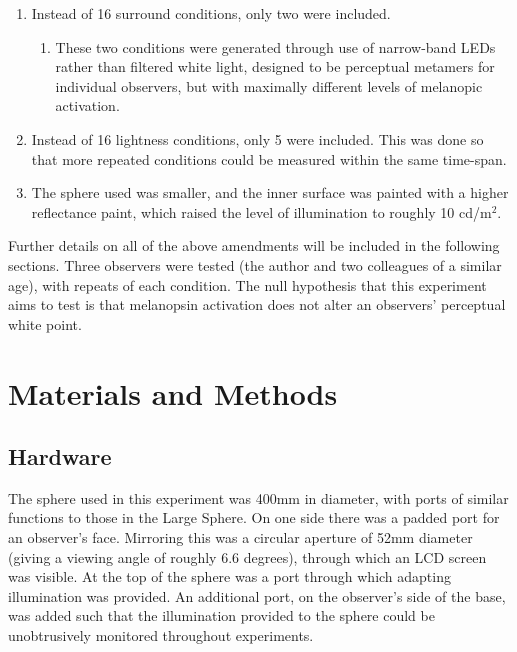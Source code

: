 \begin{enumerate}
    \item Instead of 16 surround conditions, only two were included.
    \begin{enumerate}
        \item These two conditions were generated through use of narrow-band \glspl{LED} rather than filtered white light, designed to be perceptual metamers for individual observers, but with maximally different levels of melanopic activation.
    \end{enumerate}
    \item Instead of 16 lightness conditions, only 5 were included. This was done so that more repeated conditions could be measured within the same time-span.
    \item The sphere used was smaller, and the inner surface was painted with a higher reflectance paint, which raised the level of illumination to roughly 10 cd/m$^2$.
\end{enumerate}

Further details on all of the above amendments will be included in the following sections. Three observers were tested (the author and two colleagues of a similar age), with repeats of each condition. The null hypothesis that this experiment aims to test is that melanopsin activation does not alter an observers' perceptual white point.

\section{Materials and Methods}

\subsection{Hardware}

The sphere used in this experiment was 400mm in diameter, with ports of similar functions to those in the Large Sphere. On one side there was a padded port for an observer's face. Mirroring this was a circular aperture of 52mm diameter (giving a viewing angle of roughly 6.6 degrees), through which an LCD screen was visible. At the top of the sphere was a port through which adapting illumination was provided. An additional port, on the observer's side of the base, was added such that the illumination provided to the sphere could be unobtrusively monitored throughout experiments.


